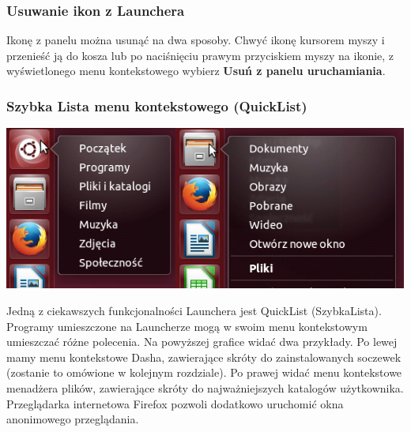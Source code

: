 \subsubsection{Usuwanie ikon z Launchera}
Ikonę z panelu można usunąć na dwa sposoby. Chwyć ikonę kursorem myszy i przenieść ją do kosza lub po naciśnięciu prawym przyciskiem myszy na ikonie, z wyświetlonego menu kontekstowego wybierz \textbf{Usuń z panelu uruchamiania}.
\clearpage

\subsubsection{Szybka Lista menu kontekstowego (QuickList)}
\begin{center}
	\includegraphics[scale=0.75]{images/unity_launcher_quicklist.png}
\end{center}

Jedną z ciekawszych funkcjonalności Launchera jest QuickList (SzybkaLista). Programy umieszczone na Launcherze mogą w swoim menu kontekstowym umieszczać różne polecenia. Na powyższej grafice widać dwa przykłady. Po lewej mamy menu kontekstowe Dasha, zawierające skróty do zainstalowanych soczewek (zostanie to omówione w kolejnym rozdziale). Po prawej widać menu kontekstowe menadżera plików, zawierające skróty do najważniejszych katalogów użytkownika. Przeglądarka internetowa Firefox pozwoli dodatkowo uruchomić okna anonimowego przeglądania.
\clearpage